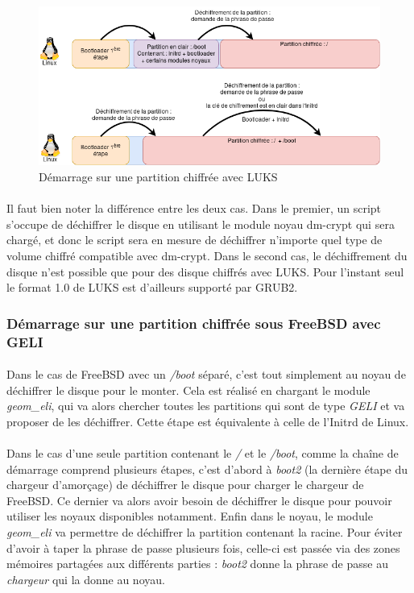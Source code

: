 \begin{figure}[h]
\centering
\includegraphics[width=.9\linewidth]{etat_art/DemarrageLinux.png}
\caption{\label{fig:demarrageLinux}Démarrage sur une partition chiffrée avec LUKS}
\end{figure}

\paragraph{}

Il faut bien noter la différence entre les deux cas. Dans le premier, un script
s'occupe de déchiffrer le disque en utilisant le module noyau dm-crypt qui sera
chargé, et donc le script sera en mesure de déchiffrer n'importe quel type de
volume chiffré compatible avec dm-crypt. Dans le second cas, le
déchiffrement du disque n'est possible que pour des disque chiffrés avec LUKS.
Pour l'instant seul le format 1.0 de LUKS est d'ailleurs supporté par GRUB2.

\subsubsection{Démarrage sur une partition chiffrée sous FreeBSD avec GELI}

\paragraph{}
Dans le cas de FreeBSD avec un {\em /boot} séparé, c'est tout simplement au
noyau de déchiffrer le disque pour le monter. Cela est réalisé en chargant
le module {\em geom\_eli}, qui va alors chercher toutes les partitions qui sont
de type {\em GELI} et va proposer de les déchiffrer. Cette étape est
équivalente à celle de l'Initrd de Linux.

\paragraph{}
Dans le cas d'une seule partition contenant le {\em /} et le {\em /boot}, comme
la chaîne de démarrage comprend plusieurs étapes, c'est d'abord à {\em boot2}
(la dernière étape du chargeur d'amorçage) de déchiffrer le disque pour charger le chargeur
de FreeBSD. Ce dernier va alors avoir besoin de déchiffrer le disque pour pouvoir
utiliser les noyaux disponibles notamment. Enfin dans le noyau, le module
{\em geom\_eli} va permettre de déchiffrer la partition contenant la racine.
Pour éviter d'avoir à taper la phrase de passe plusieurs fois, celle-ci
est passée via des zones mémoires partagées aux différents parties :
{\em boot2} donne la phrase de passe au {\em chargeur} qui la donne au noyau.


